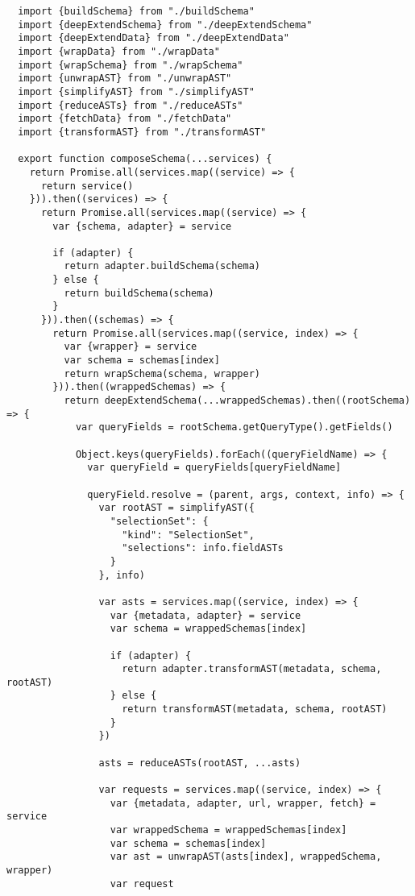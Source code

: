 \begin{verbatim}
  import {buildSchema} from "./buildSchema"
  import {deepExtendSchema} from "./deepExtendSchema"
  import {deepExtendData} from "./deepExtendData"
  import {wrapData} from "./wrapData"
  import {wrapSchema} from "./wrapSchema"
  import {unwrapAST} from "./unwrapAST"
  import {simplifyAST} from "./simplifyAST"
  import {reduceASTs} from "./reduceASTs"
  import {fetchData} from "./fetchData"
  import {transformAST} from "./transformAST"

  export function composeSchema(...services) {
    return Promise.all(services.map((service) => {
      return service()
    })).then((services) => {
      return Promise.all(services.map((service) => {
        var {schema, adapter} = service

        if (adapter) {
          return adapter.buildSchema(schema)
        } else {
          return buildSchema(schema)
        }
      })).then((schemas) => {
        return Promise.all(services.map((service, index) => {
          var {wrapper} = service
          var schema = schemas[index]
          return wrapSchema(schema, wrapper)
        })).then((wrappedSchemas) => {
          return deepExtendSchema(...wrappedSchemas).then((rootSchema) => {
            var queryFields = rootSchema.getQueryType().getFields()

            Object.keys(queryFields).forEach((queryFieldName) => {
              var queryField = queryFields[queryFieldName]

              queryField.resolve = (parent, args, context, info) => {
                var rootAST = simplifyAST({
                  "selectionSet": {
                    "kind": "SelectionSet",
                    "selections": info.fieldASTs
                  }
                }, info)

                var asts = services.map((service, index) => {
                  var {metadata, adapter} = service
                  var schema = wrappedSchemas[index]

                  if (adapter) {
                    return adapter.transformAST(metadata, schema, rootAST)
                  } else {
                    return transformAST(metadata, schema, rootAST)
                  }
                })

                asts = reduceASTs(rootAST, ...asts)

                var requests = services.map((service, index) => {
                  var {metadata, adapter, url, wrapper, fetch} = service
                  var wrappedSchema = wrappedSchemas[index]
                  var schema = schemas[index]
                  var ast = unwrapAST(asts[index], wrappedSchema, wrapper)
                  var request


\end{verbatim}
